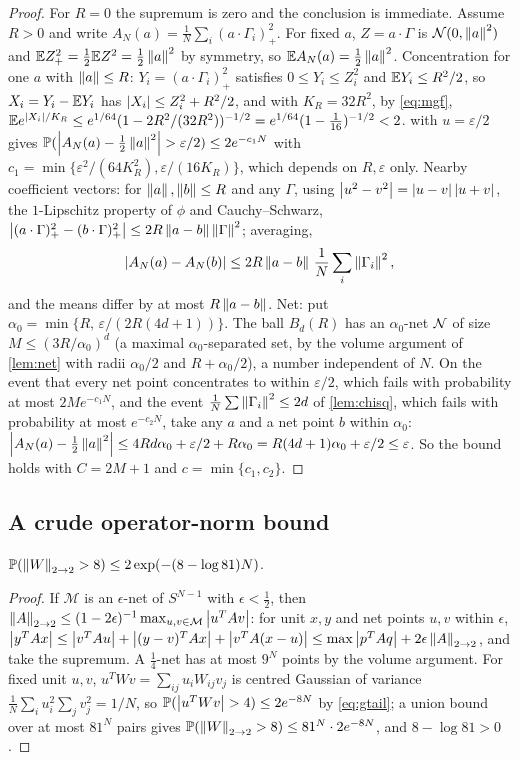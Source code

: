 \begin{proof}
For $R=0$ the supremum is zero and the conclusion is immediate. Assume $R>0$ and write $A_N(a)=\frac1N\sum_i(a\cdot\Gamma_i)_+^2$. For fixed $a$, $Z=a\cdot\Gamma$ is $\mathcal N(0,\left\lVert a\right\rVert^2)$ and $\mathbb{E} Z_+^2=\tfrac12\mathbb{E} Z^2=\tfrac12\left\lVert a\right\rVert^2$ by symmetry, so $\mathbb{E} A_N(a)=\tfrac12\left\lVert a\right\rVert^2$. Concentration for one $a$ with $\left\lVert a\right\rVert\le R$: $Y_i=(a\cdot\Gamma_i)_+^2$ satisfies $0\le Y_i\le Z_i^2$ and $\mathbb{E} Y_i\le R^2/2$, so $X_i=Y_i-\mathbb{E} Y_i$ has $\left\lvert X_i\right\rvert\le Z_i^2+R^2/2$, and with $K_R=32R^2$, by \cref{eq:mgf}, $\mathbb{E} e^{\left\lvert X_i\right\rvert/K_R}\le e^{1/64}(1-2R^2/(32R^2))^{-1/2}=e^{1/64}(1-\tfrac1{16})^{-1/2}<2$.  with $u=\varepsilon/2$ gives $\mathbb{P}(\left\lvert A_N(a)-\tfrac12\left\lVert a\right\rVert^2\right\rvert>\varepsilon/2)\le2e^{-c_1N}$ with $c_1=\min\{\varepsilon^2/(64K_R^2),\varepsilon/(16K_R)\}$, which depends on $R,\varepsilon$ only. Nearby coefficient vectors: for $\left\lVert a\right\rVert,\left\lVert b\right\rVert\le R$ and any $\Gamma$, using $\left\lvert u^2-v^2\right\rvert=\left\lvert u-v\right\rvert\left\lvert u+v\right\rvert$, the $1$-Lipschitz property of $\phi$ and Cauchy--Schwarz, $\left\lvert (a\cdot\Gamma)_+^2-(b\cdot\Gamma)_+^2\right\rvert\le2R\left\lVert a-b\right\rVert\left\lVert \Gamma\right\rVert^2$; averaging,
\[
\left\lvert A_N(a)-A_N(b)\right\rvert\le2R\left\lVert a-b\right\rVert\,\frac1N\sum_i\left\lVert \Gamma_i\right\rVert^2,
\]
and the means differ by at most $R\left\lVert a-b\right\rVert$. Net: put $\alpha_0=\min\{R,\,\varepsilon/(2R(4d+1))\}$. The ball $B_d(R)$ has an $\alpha_0$-net $\mathcal{N}$ of size $M\le(3R/\alpha_0)^d$ (a maximal $\alpha_0$-separated set, by the volume argument of \cref{lem:net} with radii $\alpha_0/2$ and $R+\alpha_0/2$), a number independent of $N$. On the event that every net point concentrates to within $\varepsilon/2$, which fails with probability at most $2Me^{-c_1N}$, and the event $\frac1N\sum\left\lVert \Gamma_i\right\rVert^2\le2d$ of \cref{lem:chisq}, which fails with probability at most $e^{-c_2N}$, take any $a$ and a net point $b$ within $\alpha_0$: $\left\lvert A_N(a)-\tfrac12\left\lVert a\right\rVert^2\right\rvert\le4Rd\alpha_0+\varepsilon/2+R\alpha_0=R(4d+1)\alpha_0+\varepsilon/2\le\varepsilon$. So the bound holds with $C=2M+1$ and $c=\min\{c_1,c_2\}$.
\end{proof}

\subsection{A crude operator-norm bound}

\begin{lemma}\label{lem:opnorm}
$\mathbb{P}(\left\lVert W\right\rVert_{2\to 2}>8)\le2\exp(-(8-\log81)N)$.
\end{lemma}

\begin{proof}
If $\mathcal M$ is an $\epsilon$-net of $S^{N-1}$ with $\epsilon<\tfrac12$, then $\left\lVert A\right\rVert_{2\to 2}\le(1-2\epsilon)^{-1}\max_{u,v\in\mathcal M}\left\lvert u^TAv\right\rvert$: for unit $x,y$ and net points $u,v$ within $\epsilon$, $\left\lvert y^TAx\right\rvert\le\left\lvert v^TAu\right\rvert+\left\lvert (y-v)^TAx\right\rvert+\left\lvert v^TA(x-u)\right\rvert\le\max\left\lvert p^TAq\right\rvert+2\epsilon\left\lVert A\right\rVert_{2\to 2}$, and take the supremum. A $\tfrac14$-net has at most $9^N$ points by the volume argument. For fixed unit $u,v$, $u^TWv=\sum_{ij}u_iW_{ij}v_j$ is centred Gaussian of variance $\frac1N\sum_iu_i^2\sum_jv_j^2=1/N$, so $\mathbb{P}(\left\lvert u^TWv\right\rvert>4)\le2e^{-8N}$ by \cref{eq:gtail}; a union bound over at most $81^N$ pairs gives $\mathbb{P}(\left\lVert W\right\rVert_{2\to 2}>8)\le81^N\cdot2e^{-8N}$, and $8-\log81>0$.
\end{proof}

